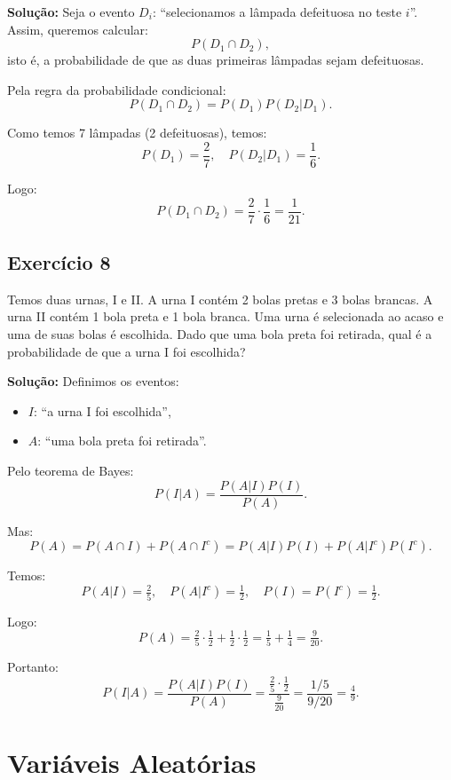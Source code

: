 \documentclass{article}
\begin{document}
\vspace{0.5cm}
\textbf{Solução:} Seja o evento $D_i$: ``selecionamos a lâmpada defeituosa no teste $i$''. Assim, queremos calcular:
    $$
    P(D_1 \cap D_2),
    $$
isto é, a probabilidade de que as duas primeiras lâmpadas sejam defeituosas.

Pela regra da probabilidade condicional:
    $$
    P(D_1 \cap D_2) = P(D_1) P(D_2|D_1).
    $$

Como temos 7 lâmpadas (2 defeituosas), temos:
    $$
    P(D_1) = \frac{2}{7}, \quad P(D_2|D_1) = \frac{1}{6}.
    $$
    
Logo:
    $$
    P(D_1 \cap D_2) = \frac{2}{7} \cdot \frac{1}{6} = \frac{1}{21}.
    $$

\subsection{Exercício 8}
Temos duas urnas, I e II. A urna I contém 2 bolas pretas e 3 bolas brancas. A urna II contém 1 bola preta e 1 bola branca. Uma urna é selecionada ao acaso e uma de suas bolas é escolhida. Dado que uma bola preta foi retirada, qual é a probabilidade de que a urna I foi escolhida?

\vspace{0.5cm}
\textbf{Solução:} Definimos os eventos:
\begin{itemize}
    \item $I$: ``a urna I foi escolhida'',
    \item $A$: ``uma bola preta foi retirada''.
\end{itemize}

Pelo teorema de Bayes:
    $$
    P(I|A) = \frac{P(A|I)P(I)}{P(A)}.
    $$

Mas:
    $$
    P(A) = P(A \cap I) + P(A \cap I^c) = P(A|I)P(I) + P(A|I^c)P(I^c).
    $$

Temos:
    $$
    P(A|I) = \tfrac{2}{5}, \quad P(A|I^c) = \tfrac{1}{2}, \quad P(I)=P(I^c)=\tfrac{1}{2}.
    $$

Logo:
    $$
    P(A) = \tfrac{2}{5}\cdot\tfrac{1}{2} + \tfrac{1}{2}\cdot\tfrac{1}{2} 
    = \tfrac{1}{5} + \tfrac{1}{4} 
    = \tfrac{9}{20}.
    $$

Portanto:
    $$
    P(I|A) = \frac{P(A|I)P(I)}{P(A)} 
    = \frac{\tfrac{2}{5}\cdot\tfrac{1}{2}}{\tfrac{9}{20}} 
    = \frac{1/5}{9/20} 
    = \tfrac{4}{9}.
    $$

\section{Variáveis Aleatórias}
\end{document}
